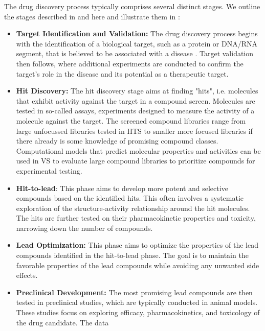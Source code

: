 The drug discovery process typically comprises several distinct stages. We outline the stages
described in \citet{hughesPrinciplesEarlyDrug2011} and \citep{umscheidKeyConceptsClinical2011} here and illustrate them in :
\begin{itemize}
	\item \textbf{Target Identification and Validation:} The drug discovery process begins with the identification of a
	      biological target, such as a protein or DNA/RNA segment, that is believed to be associated with a disease
	      \citep{immingDrugsTheirTargets2006}. Target validation then follows, where additional experiments are
	      conducted to confirm the target's role in the disease and its potential as a therapeutic target.
	\item \textbf{Hit Discovery:} The hit discovery stage aims at finding "hits", i.e. molecules
	      that exhibit activity against the target in a compound screen. Molecules are tested in
	      so-called assays, experiments designed to measure the activity of a molecule against the
	      target. The screened compound libraries range from large unfocussed libraries tested in
	      \ac{HTS} to smaller more focused libraries if there already is some knowledge of promising
	      compound classes. Computational models that predict molecular properties and activities
	      can be used in \ac{VS}
	      \citep{waltersVirtualScreeningOverview1998,shoichetVirtualScreeningChemical2004a} to
	      evaluate large compound libraries to prioritize compounds for experimental testing.
	\item \textbf{Hit-to-lead}: This phase aims to develop more potent and selective compounds
	      based on the identified hits. This often involves a systematic exploration of the
	      structure-activity relationship around the hit molecules.  The hits are further tested on
	      their pharmacokinetic properties and toxicity, narrowing down the number of
	      compounds.
	\item \textbf{Lead Optimization:} This phase aims to optimize the properties of the
	      lead compounds identified in the hit-to-lead phase. The goal is to maintain the favorable
	      properties of the lead compounds while avoiding any unwanted side effects.
	\item \textbf{Preclinical Development:} The most promising lead compounds are then tested in
	      preclinical studies, which are typically conducted in animal models. These studies focus
	      on exploring efficacy, pharmacokinetics, and toxicology of the drug candidate. The data

\end{itemize}
